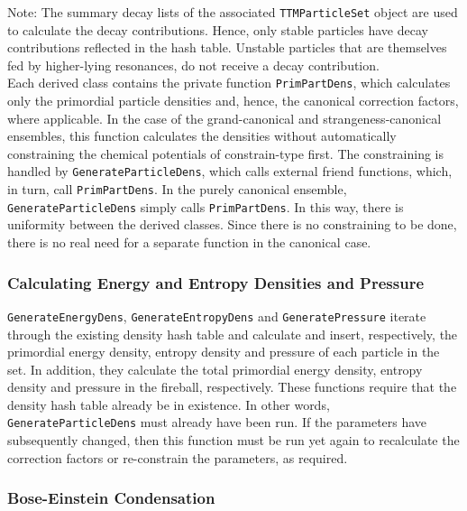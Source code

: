 \documentclass{elsarticle}
\begin{document}
Note: The summary decay lists of the associated
\texttt{TTMParticleSet} object are used to calculate the decay contributions. Hence, only 
stable particles have decay contributions reflected in 
the hash table. Unstable particles that are themselves fed by higher-lying 
resonances, do not receive a decay contribution.\\

Each derived class contains the private function \texttt{PrimPartDens}, which calculates only the primordial 
particle densities and, hence, the canonical correction factors, where applicable. In the case of 
the grand-canonical and strangeness-canonical ensembles, this function calculates the densities without 
automatically constraining the chemical potentials of constrain-type first. The constraining is handled by 
\texttt{GenerateParticleDens}, which calls external friend functions, which, in turn, call 
\texttt{PrimPartDens}. In the purely canonical ensemble, \texttt{GenerateParticleDens} simply calls 
\texttt{PrimPartDens}. In this way, there is uniformity between the derived classes. Since there is no 
constraining to be done, there is no real need for a separate function in the canonical case.\\  

\subsubsection{Calculating Energy and Entropy Densities and Pressure}

\texttt{GenerateEnergyDens}, \texttt{GenerateEntropyDens} and \texttt{GeneratePressure} 
iterate through the existing density 
hash table and calculate and insert, respectively, the primordial energy density, entropy density and pressure of each 
particle in the set. In addition, they calculate the total primordial energy density, entropy 
density and pressure in the fireball, respectively. These functions require that the density hash table 
already be in existence. In other 
words, \texttt{GenerateParticleDens} must already have been run. If the parameters have subsequently changed, 
then this function must be run yet again to recalculate the correction factors or re-constrain the parameters, 
as required.\\

\subsubsection{Bose-Einstein Condensation}
\end{document}
